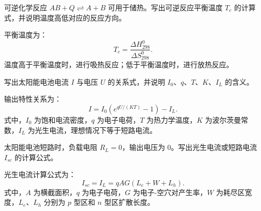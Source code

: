 \begin{problem}[化学储热可逆反应平衡温度]\label{exer:calc_04_solar_p102_01}
可逆化学反应 \(AB + Q \rightleftharpoons A + B\) 可用于储热。写出可逆反应平衡温度 \(T_c\) 的计算式，并说明温度高低对应的反应方向。
\end{problem}

\begin{solution}
平衡温度为：
\begin{equation}
T_c = \frac{\Delta H^0_{298}}{\Delta S^0_{298}}.
\end{equation}
温度高于平衡温度时，进行吸热反应；低于平衡温度时，进行放热反应。
\end{solution}

\begin{problem}\label{exer:calc_04_solar_p121_01}
写出太阳能电池电流 \(I\) 与电压 \(U\) 的关系式，并说明 \(I_0\)、\(q\)、\(T\)、\(K\)、\(I_L\) 的含义。
\end{problem}

\begin{solution}
输出特性关系为：
\begin{equation}
I = I_0\left(e^{qU/(KT)} - 1\right) - I_L.
\end{equation}
式中，\(I_0\) 为饱和电流密度，\(q\) 为电子电荷，\(T\) 为热力学温度，\(K\) 为波尔茨曼常数，\(I_L\) 为光生电流，理想情况下等于短路电流。
\end{solution}

\begin{problem}[光生电流]\label{exer:calc_04_solar_p122_01}
太阳能电池短路时，负载电阻 \(R_L=0\)，输出电压为 \(0\)。写出光生电流或短路电流 \(I_{sc}\) 的计算公式。
\end{problem}

\begin{solution}
光生电流计算公式为：
\begin{equation}
I_{sc} = I_L = qAG(L_e + W + L_h).
\end{equation}
式中，\(A\) 为横截面积，\(q\) 为电子电荷，\(G\) 为电子-空穴对产生率，\(W\) 为耗尽区宽度，\(L_e\)、\(L_h\) 分别为 \(p\) 型区和 \(n\) 型区扩散长度。
\end{solution}

